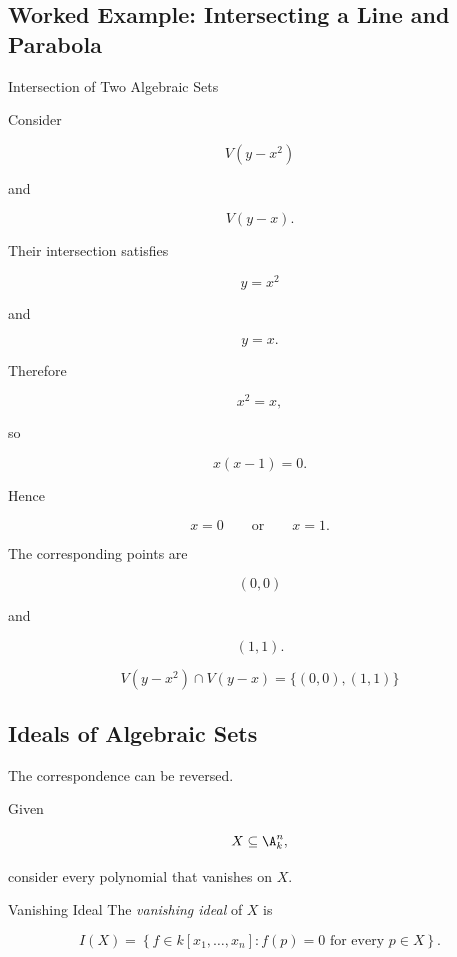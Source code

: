 \subsection{Worked Example: Intersecting a Line and Parabola}
\label{subsec:worked-line-parabola}

\begin{workedexamplebox}{Intersection of Two Algebraic Sets}

Consider

\[
V(y-x^2)
\]

and

\[
V(y-x).
\]

Their intersection satisfies

\[
y=x^2
\]

and

\[
y=x.
\]

Therefore

\[
x^2=x,
\]

so

\[
x(x-1)=0.
\]

Hence

\[
x=0
\qquad\text{or}\qquad
x=1.
\]

The corresponding points are

\[
(0,0)
\]

and

\[
(1,1).
\]

\begin{answerbox}
\[
\boxed{
V(y-x^2)\cap V(y-x)
=
\{(0,0),(1,1)\}
}
\]
\end{answerbox}
\end{workedexamplebox}

\subsection{Ideals of Algebraic Sets}
\label{subsec:ideals-of-algebraic-sets}

The correspondence can be reversed.

Given

\[
X\subseteq\A^n_k,
\]

consider every polynomial that vanishes on \(X\).

\begin{definitionbox}{Vanishing Ideal}
The \emph{vanishing ideal} of \(X\) is

\[
\boxed{
I(X)
=
\left\{
f\in k[x_1,\ldots,x_n]:
f(p)=0
\text{ for every }p\in X
\right\}.
}
\]
\end{definitionbox}


